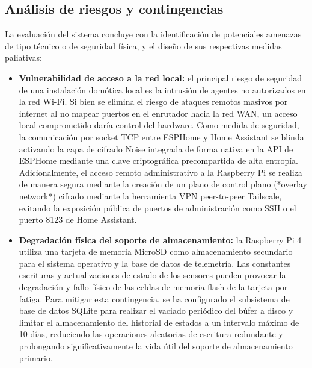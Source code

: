 \subsection{Análisis de riesgos y contingencias}
\label{sec:riesgos_contingencias}
La evaluación del sistema concluye con la identificación de potenciales amenazas de tipo técnico o de seguridad física, y el diseño de sus respectivas medidas paliativas:

\begin{itemize}
    \item \textbf{Vulnerabilidad de acceso a la red local:} el principal riesgo de seguridad de una instalación domótica local es la intrusión de agentes no autorizados en la red Wi-Fi. Si bien se elimina el riesgo de ataques remotos masivos por internet al no mapear puertos en el enrutador hacia la red WAN, un acceso local comprometido daría control del hardware. Como medida de seguridad, la comunicación por socket TCP entre ESPHome y Home Assistant se blinda activando la capa de cifrado Noise integrada de forma nativa en la API de ESPHome mediante una clave criptográfica precompartida de alta entropía. Adicionalmente, el acceso remoto administrativo a la Raspberry Pi se realiza de manera segura mediante la creación de un plano de control plano (*overlay network*) cifrado mediante la herramienta VPN peer-to-peer Tailscale, evitando la exposición pública de puertos de administración como SSH o el puerto 8123 de Home Assistant.
    \item \textbf{Degradación física del soporte de almacenamiento:} la Raspberry Pi 4 utiliza una tarjeta de memoria MicroSD como almacenamiento secundario para el sistema operativo y la base de datos de telemetría. Las constantes escrituras y actualizaciones de estado de los sensores pueden provocar la degradación y fallo físico de las celdas de memoria flash de la tarjeta por fatiga. Para mitigar esta contingencia, se ha configurado el subsistema de base de datos SQLite para realizar el vaciado periódico del búfer a disco y limitar el almacenamiento del historial de estados a un intervalo máximo de 10 días, reduciendo las operaciones aleatorias de escritura redundante y prolongando significativamente la vida útil del soporte de almacenamiento primario.
\end{itemize}
